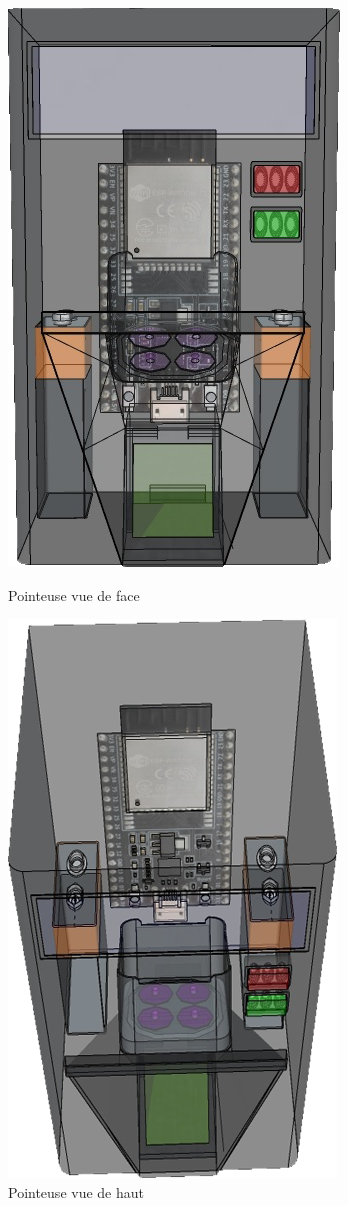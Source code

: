 \begin{figure}[!htb]
    \begin{minipage}{0.5\textwidth}
        \centering
        \includegraphics[scale=0.6]{images/prototype/1.png}
        \caption{Pointeuse vue de face}\label{ }
    \end{minipage}\hfill
    \begin{minipage}{0.5\textwidth}
        \centering
        \includegraphics[scale=0.6]{images/prototype/2.png}
        \caption{Pointeuse vue de haut}\label{ }
    \end{minipage}
\end{figure}


